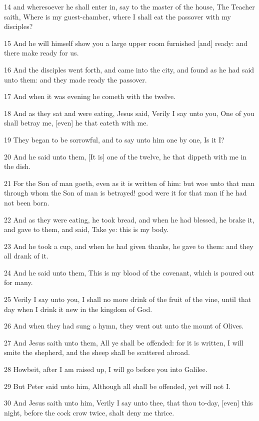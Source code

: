 \par 14 and wheresoever he shall enter in, say to the master of the house, The Teacher saith, Where is my guest-chamber, where I shall eat the passover with my disciples?
\par 15 And he will himself show you a large upper room furnished [and] ready: and there make ready for us.
\par 16 And the disciples went forth, and came into the city, and found as he had said unto them: and they made ready the passover.
\par 17 And when it was evening he cometh with the twelve.
\par 18 And as they sat and were eating, Jesus said, Verily I say unto you, One of you shall betray me, [even] he that eateth with me.
\par 19 They began to be sorrowful, and to say unto him one by one, Is it I?
\par 20 And he said unto them, [It is] one of the twelve, he that dippeth with me in the dish.
\par 21 For the Son of man goeth, even as it is written of him: but woe unto that man through whom the Son of man is betrayed! good were it for that man if he had not been born.
\par 22 And as they were eating, he took bread, and when he had blessed, he brake it, and gave to them, and said, Take ye: this is my body.
\par 23 And he took a cup, and when he had given thanks, he gave to them: and they all drank of it.
\par 24 And he said unto them, This is my blood of the covenant, which is poured out for many.
\par 25 Verily I say unto you, I shall no more drink of the fruit of the vine, until that day when I drink it new in the kingdom of God.
\par 26 And when they had sung a hymn, they went out unto the mount of Olives.
\par 27 And Jesus saith unto them, All ye shall be offended: for it is written, I will smite the shepherd, and the sheep shall be scattered abroad.
\par 28 Howbeit, after I am raised up, I will go before you into Galilee.
\par 29 But Peter said unto him, Although all shall be offended, yet will not I.
\par 30 And Jesus saith unto him, Verily I say unto thee, that thou to-day, [even] this night, before the cock crow twice, shalt deny me thrice.
